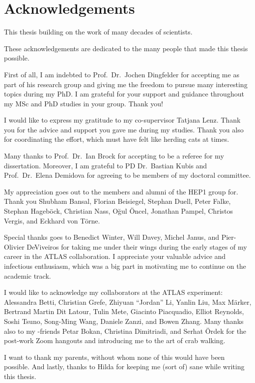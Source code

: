 \chapter*{Acknowledgements}

This thesis building on the work of many decades of scientists.

These acknowledgements are dedicated to the many people that made this thesis
possible.


First of all, I am indebted to Prof.\ Dr.\ Jochen Dingfelder for accepting me as
part of his research group and giving me the freedom to pursue many interesting
topics during my PhD. I am grateful for your support and guidance throughout my
MSc and PhD studies in your group. Thank you!

I would like to express my gratitude to my co-supervisor Tatjana Lenz. Thank you
for the advice and support you gave me during my studies. Thank you also for
coordinating the \bbtautau effort, which must have felt like herding cats at
times.

Many thanks to Prof.\ Dr.\ Ian Brock for accepting to be a referee for my
dissertation. Moreover, I am grateful to PD Dr.\ Bastian Kubis and Prof.\ Dr.\
Elena Demidova for agreeing to be members of my doctoral committee.

My appreciation goes out to the members and alumni of the \textsc{HEP1} group
for. Thank you Shubham Bansal, Florian Beisiegel, Stephan Duell, Peter Falke,
Stephan Hageböck, Christian Nass, Oğul Öncel, Jonathan Pampel, Christos Vergis,
and Eckhard von Törne.

Special thanks goes to Benedict Winter, Will Davey, Michel Janus, and
Pier-Olivier DeViveiros for taking me under their wings during the early stages
of my career in the ATLAS collaboration. I appreciate your valuable advice and
infectious enthusiasm, which was a big part in motivating me to continue on the
academic track.

I would like to acknowledge my collaborators at the ATLAS experiment: Alessandra
Betti, Christian Grefe, Zhiyuan ``Jordan'' Li, Yanlin Liu, Max Märker, Bertrand
Martin Dit Latour, Tulin Mete, Giacinto Piacquadio, Elliot Reynolds, Soshi
Tsuno, Song-Ming Wang, Daniele Zanzi, and Bowen Zhang. Many thanks also to my
\bbtautau-friends Petar Bokan, Christina Dimitriadi, and Serhat Ördek for the
post-work Zoom hangouts and introducing me to the art of crab walking.

I want to thank my parents, without whom none of this would have been
possible. And lastly, thanks to Hilda for keeping me (sort of) sane while
writing this thesis.


